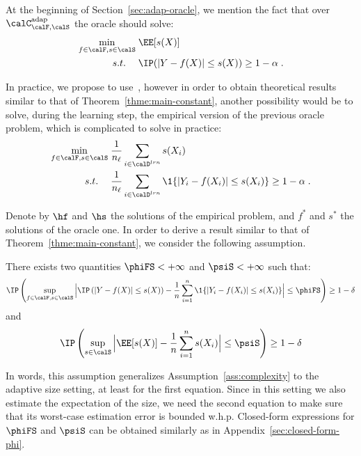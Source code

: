 At the beginning of Section~\ref{sec:adap-oracle}, we mention the fact that over $\calC^{\text{adap}}_{\calF,\calS}$ the oracle should solve:
\begin{align*}
    \min_{f\in\calF,s\in\calS} &\; \EE[s(X)]  \\
     \quad s.t. \quad &\;  \IP(|Y-f(X)|\leq s(X)) \geq 1-\alpha
     \;. \nonumber
\end{align*}

In practice, we propose to use~\methodAD, however in order to obtain theoretical results similar to that of Theorem~\ref{thme:main-constant}, another possibility would be to solve, during the learning step, the empirical version of the previous oracle problem, which is complicated to solve in practice:
\begin{align*}
    \min_{f\in\calF,s\in\calS} &\; \frac{1}{n_\ell}\sum_{i\in\calD^{lrn}}s(X_i)  \\
     \quad s.t. \quad &\;  \frac{1}{n_\ell}\sum_{i\in\calD^{lrn}}\1\{|Y_i-f(X_i)|\leq s(X_i)\}\geq 1-\alpha
     \;. \nonumber
\end{align*}

Denote by $\hf$ and $\hs$ the solutions of the empirical problem, and $f^*$ and $s^*$ the solutions of the oracle one. In order to derive a result similar to that of Theorem~\ref{thme:main-constant}, we consider the following assumption.

\begin{assumption} \label{ass:complexity-ad} There exists two quantities $\phiFS<+\infty$ and $\psiS<+\infty$ such that:
    \begin{equation*}
        \IP\left(\sup_{f\in\calF,s\in\calS}\Big|\IP\left(|Y-f(X)|\leq s(X)\right) - \frac{1}{n}\sum_{i=1}^n\1\{|Y_i-f(X_i)|\leq s(X_i)\}\Big|\leq \phiFS\right)\geq 1-\delta
    \end{equation*}
    and
    \begin{equation*}
        \IP\left(\sup_{s\in\calS}\Big|\EE[s(X)] - \frac{1}{n}\sum_{i=1}^n s(X_i)\Big|\leq \psiS\right)\geq 1-\delta
    \end{equation*}
\end{assumption}

In words, this assumption generalizes Assumption~\ref{ass:complexity} to the adaptive size setting, at least for the first equation. Since in this setting we also estimate the expectation of the size, we need the second equation to make sure that its worst-case estimation error is bounded w.h.p. Closed-form expressions for $\phiFS$ and $\psiS$ can be obtained similarly as in Appendix~\ref{sec:closed-form-phi}.

